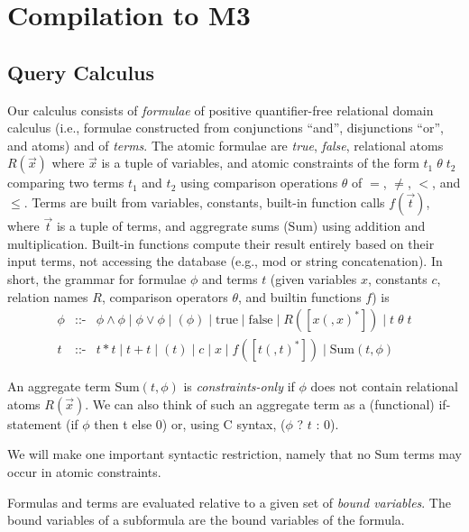 

\section{Compilation to M3}
\label{sec:compiler}


\subsection{Query Calculus}


\def\safe{\mbox{safe}}
\def\AggSum{\mbox{Sum}}

Our calculus consists of
{\em formulae} of positive quantifier-free relational domain calculus
(i.e., formulae constructed from conjunctions ``and'',
disjunctions ``or'', and atoms) and of {\em terms}.
%
The atomic formulae are {\em true}, {\em false}, relational atoms $R(\vec{x})$
where $\vec{x}$ is a tuple of variables,
and atomic constraints of the form $t_1 \;\theta\; t_2$ comparing two terms
$t_1$ and $t_2$ using comparison operations $\theta$ of $=$, $\neq$, $<$,
and $\leq$.
%
Terms are built from variables, constants, built-in function calls
$f(\vec{t})$, where $\vec{t}$ is a tuple of terms,
and aggregrate sums ($\AggSum$) using addition and multiplication.
Built-in functions compute their result entirely based on their input
terms, not accessing the database (e.g., mod or string concatenation).
In short, the grammar for formulae $\phi$ and terms $t$
(given variables $x$, constants $c$, relation names $R$,
comparison operators $\theta$,
and builtin functions $f$) is
\begin{eqnarray*}
  \phi &\mbox{::-}& \phi \land \phi
               \mid \phi \lor \phi \mid (\phi)
               \mid \mbox{true} \mid \mbox{false} \mid R([x(,x)^*])
               \mid t \;\theta\; t
\\
  t &\mbox{::-}& t * t \mid t + t \mid (t) \mid c \mid x \mid f([t(,t)^*]) \mid
                 \AggSum(t, \phi)
\end{eqnarray*}

An aggregate term $\AggSum(t, \phi)$
is {\em constraints-only} if $\phi$ does not
contain relational atoms $R(\vec{x})$.
We can also think of such an aggregate term as a (functional)
if-statement (if $\phi$ then t else 0)
or, using C syntax, ($\phi$ ? $t$ : 0).

We will make one important syntactic restriction, namely that
no $\AggSum$ terms may occur in atomic constraints.

Formulas and terms are evaluated relative to a given set of
{\em bound variables}.
The bound variables of a subformula are the bound variables of the formula.

